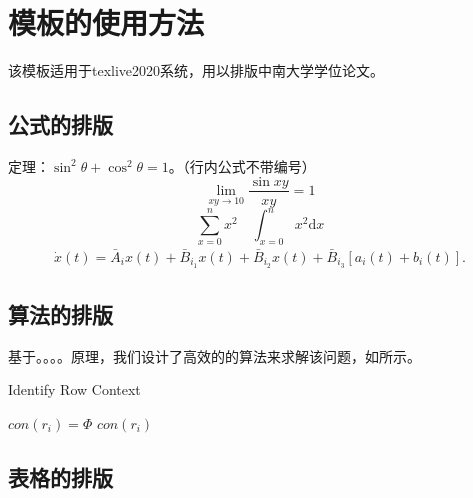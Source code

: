 \chapter{模板的使用方法}
该模板适用于texlive2020系统，用以排版中南大学学位论文。
\section{公式的排版}
定理：$\sin^2\theta + \cos^2\theta = 1$。（行内公式不带编号）
\begin{equation}
\lim\limits_{xy\to 10}\frac{\sin xy}{xy} = 1
\end{equation}
\begin{equation}
\sum_{x=0}^{n}x^2 \quad \int_{x=0}^{n}x^2 \mathrm{d}x
\end{equation}
\begin{eqnarray} 
\dot{x}(t)=\bar{A}_{i}x(t)+\bar{B}_{i_{1}}x(t)+\bar{B}_{i_{2}}x(t)+\bar{B}_{i_{3}}[a_{i}(t)+b_{i}(t)].
\end{eqnarray}

\section{算法的排版}
基于。。。。原理，我们设计了高效的的算法来求解该问题，如所示。
\begin{algorithm} 
	\caption{Identify Row Context} \label{alg:a}
	$con(r_i)= \Phi$\; 
	\Return $con(r_i)$\; 
\end{algorithm}

\section{表格的排版}

